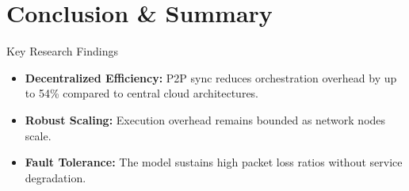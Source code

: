 \section{Conclusion \& Summary}

\begin{frame}{Key Research Findings}
  \begin{itemize}
    \item \textbf{Decentralized Efficiency:} P2P sync reduces orchestration overhead by up to 54\% compared to central cloud architectures.
    \item \textbf{Robust Scaling:} Execution overhead remains bounded as network nodes scale.
    \item \textbf{Fault Tolerance:} The model sustains high packet loss ratios without service degradation.
  \end{itemize}
\end{frame}

{
}
